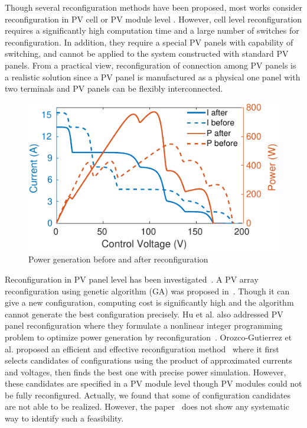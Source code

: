 \documentclass[conference]{pvsctran}
\begin{document}
Though several reconfiguration methods have been proposed, most works consider reconfiguration in PV cell or PV module level \cite{nguyen2008adaptive,wang2014architecture,storey2013improved,storey2014optimized,udenze2018reconfiguration}. 
However, cell level reconfiguration requires a significantly high computation time and a large number of switches for reconfiguration. 
In addition, they require a special PV panels with capability of switching, and cannot be applied to the system constructed with standard PV panels. 
From a practical view, reconfiguration of connection among PV panels is a realistic solution since a PV panel is manufactured as a physical one panel with two terminals and PV panels can be flexibly interconnected. 
\begin{figure}[t]
    \centering
    \includegraphics[width=0.8\linewidth]{../fig/compare.png}
    \caption{Power generation before and after reconfiguration}
    \label{compare}
\end{figure}

Reconfiguration in PV panel level has been investigated~\cite{carotenuto2015evolutionary,hu2017non,orozco2016optimized}. 
A PV array reconfiguration using genetic algorithm (GA) was proposed in~\cite{carotenuto2015evolutionary}. Though it can give a new configuration, computing cost is significantly high and the algorithm cannot generate the best configuration precisely.  
Hu et al. also addressed PV panel reconfiguration where they formulate a nonlinear integer programming problem to optimize power generation by reconfiguration~\cite{hu2017non}.
Orozco-Gutierrez et al. proposed an efficient and effective reconfiguration method~\cite{orozco2016optimized} where it first selects candidates of configurations using the product of approximated currents and voltages,
then finds the best one with precise power simulation. 
However, these candidates are specified in a PV module level though PV modules could not be fully reconfigured. Actually, we found that some of configuration candidates are not able to be realized. However, the paper~\cite{orozco2016optimized}  does not show any systematic way to identify such a feasibility. 
\end{document}
